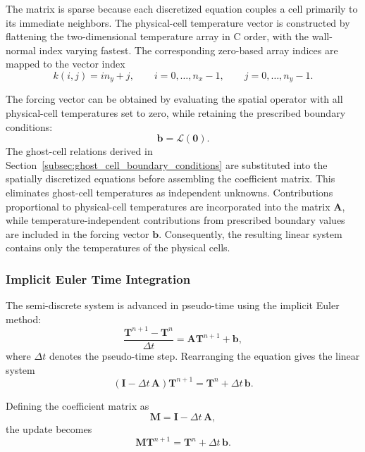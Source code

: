 The matrix is sparse because each discretized equation
couples a cell primarily to its immediate neighbors. The
physical-cell temperature vector is constructed by flattening
the two-dimensional temperature array in C order, with the
wall-normal index varying fastest. The corresponding
zero-based array indices are mapped to the vector index
\begin{equation}
k(i,j)=i n_y+j,
\qquad
i=0,\ldots,n_x-1,\qquad
j=0,\ldots,n_y-1.
\label{eq:direct_vector_index}
\end{equation}

The forcing vector can be obtained by evaluating the spatial
operator with all physical-cell temperatures set to zero,
while retaining the prescribed boundary conditions:
\begin{equation}
\boxed{
\mathbf{b}=\mathcal{L}(\mathbf{0}).
}
\label{eq:direct_forcing_vector}
\end{equation}
The ghost-cell relations derived in
Section~\ref{subsec:ghost_cell_boundary_conditions} are substituted
into the spatially discretized equations before assembling the
coefficient matrix. This eliminates ghost-cell temperatures as
independent unknowns. Contributions proportional to physical-cell
temperatures are incorporated into the matrix $\mathbf{A}$,
while temperature-independent contributions from prescribed
boundary values are included in the forcing vector $\mathbf{b}$.
Consequently, the resulting linear system contains only the
temperatures of the physical cells.

\subsubsection{Implicit Euler Time Integration}

The semi-discrete system is advanced in pseudo-time using
the implicit Euler method:
\begin{equation}
\frac{\mathbf{T}^{n+1}-\mathbf{T}^{n}}{\Delta t}
=
\mathbf{A}\mathbf{T}^{n+1}+\mathbf{b},
\label{eq:direct_implicit_euler}
\end{equation}
where $\Delta t$ denotes the pseudo-time step. Rearranging
the equation gives the linear system
\begin{equation}
\boxed{
\left(\mathbf{I}-\Delta t\,\mathbf{A}\right)
\mathbf{T}^{n+1}
=
\mathbf{T}^{n}+\Delta t\,\mathbf{b}.
}
\label{eq:direct_linear_system}
\end{equation}

Defining the coefficient matrix as
\begin{equation}
\mathbf{M}=\mathbf{I}-\Delta t\,\mathbf{A},
\label{eq:direct_matrix_definition}
\end{equation}
the update becomes
\begin{equation}
\mathbf{M}\mathbf{T}^{n+1}
=
\mathbf{T}^{n}+\Delta t\,\mathbf{b}.
\label{eq:direct_matrix_update}
\end{equation}

